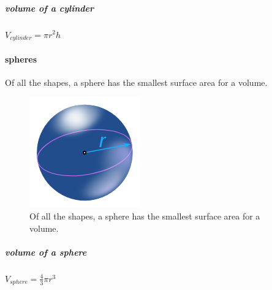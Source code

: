 \subparagraph*{volume of a cylinder} $V_{cylinder} = \pi r^2h$

\paragraph{spheres} Of all the shapes, a sphere has the smallest surface area for a volume.

\begin{figure}[h!]
    \begin{center}
        \includegraphics[scale=.25]{./public/images/sphere}
        \caption{Of all the shapes, a sphere has the smallest surface area for a volume.}
    \end{center}
\end{figure}

\subparagraph*{volume of a sphere} $V_{sphere} = \frac{4}{3} \pi r^3$